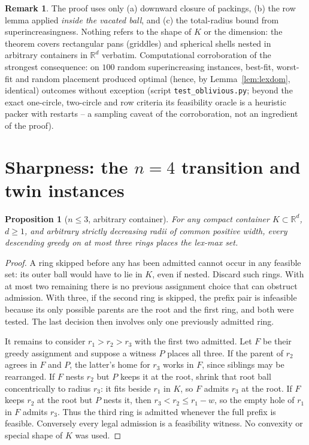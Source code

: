 \documentclass[11pt]{article}
\newtheorem{proposition}[theorem]{Proposition}
\theoremstyle{definition}
\newtheorem{remark}[theorem]{Remark}
\newcommand{\R}{\mathbb{R}}
\begin{document}
\begin{remark}
The proof uses only (a) downward closure of packings, (b) the row lemma
applied \emph{inside the vacated ball}, and (c) the total-radius bound from
superincreasingness. Nothing refers to the shape of $K$ or the dimension:
the theorem covers rectangular pans (griddles) and spherical shells nested in
arbitrary containers in $\R^d$ verbatim. Computational corroboration of the
strongest consequence: on $100$ random superincreasing instances, best-fit,
worst-fit and random placement produced optimal (hence, by
Lemma~\ref{lem:lexdom}, identical) outcomes without exception (script
\texttt{test\_oblivious.py}; beyond the exact one-circle, two-circle and row
criteria its feasibility oracle is a heuristic packer with restarts -- a
sampling caveat of the corroboration, not an ingredient of the proof).
\end{remark}

\section{Sharpness: the \texorpdfstring{$n=4$}{n=4} transition and twin instances}\label{sec:sharp}

\begin{proposition}[$n\le3$, arbitrary container]\label{prop:n3}
For any compact container $K\subset\R^d$, $d\ge1$, and arbitrary
strictly decreasing radii of common positive width, every descending
greedy on at most three rings places the lex-max set.
\end{proposition}
\begin{proof}
A ring skipped before any has been admitted cannot occur in any
feasible set: its outer ball would have to lie in $K$, even if nested.
Discard such rings. With at most two remaining there is no previous
assignment choice that can obstruct admission. With three, if the second
ring is skipped, the prefix pair is infeasible because its only possible
parents are the root and the first ring, and both were tested. The last
decision then involves only one previously admitted ring.

It remains to consider $r_1>r_2>r_3$ with the first two admitted. Let
$F$ be their greedy assignment and suppose a witness $P$ places all three.
If the parent of $r_2$ agrees in $F$ and $P$, the latter's home for $r_3$
works in $F$, since siblings may be rearranged. If $F$ nests $r_2$ but
$P$ keeps it at the root, shrink that root ball concentrically to radius
$r_3$: it fits beside $r_1$ in $K$, so $F$ admits $r_3$ at the root.
If $F$ keeps $r_2$ at the root but $P$ nests it, then
$r_3<r_2\le r_1-w$, so the empty hole of $r_1$ in $F$ admits $r_3$.
Thus the third ring is admitted whenever the full prefix is feasible.
Conversely every legal admission is a feasibility witness. No convexity
or special shape of $K$ was used.
\end{proof}
\end{document}
